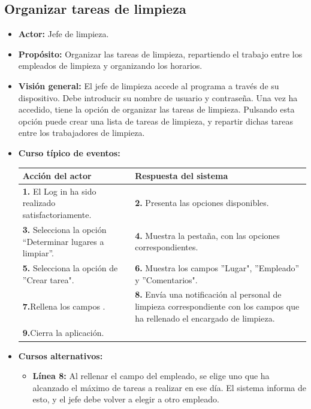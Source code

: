 \documentclass[spanish,a4paper,12pt]{report}	%
\begin{document}
	\subsection{Organizar tareas de limpieza}
			\begin{itemize}
			\item \textbf{Actor: }Jefe de limpieza.
			\item \textbf{Propósito: }Organizar las tareas de limpieza, repartiendo el trabajo entre los empleados de limpieza y organizando los horarios. 		
			\item \textbf{Visión general: }El jefe de limpieza accede al programa a través de su dispositivo. Debe introducir su nombre de usuario y contraseña. Una vez ha accedido, tiene la opción de organizar las tareas de limpieza. Pulsando esta opción puede crear una lista de tareas de limpieza, y repartir dichas tareas entre los trabajadores de limpieza. 
			\item \textbf{Curso típico de eventos:} \\	%
\begin{tabular}{|p{6cm}||p{6cm}|}
				\hline
				\textbf{Acción del actor} & \textbf{Respuesta del sistema} \\ \hline \hline
				\textbf{1.} El Log in ha sido realizado satisfactoriamente. & \textbf{2.} Presenta las opciones disponibles.\\ \hline
				\textbf{3.} Selecciona la opción “Determinar lugares a limpiar”. & \textbf{4.} Muestra la pestaña, con las opciones correspondientes. \\ \hline
				\textbf{5.} Selecciona la opción de ''Crear tarea".	& \textbf{6.} Muestra los campos ''Lugar", ''Empleado'' y ''Comentarios". \\ \hline
				\textbf{7.}Rellena los campos . & \textbf{8.} Envía una notificación al personal de limpieza correspondiente con los campos que ha rellenado el encargado de limpieza.\\ \hline
				\textbf{9.}Cierra la aplicación. & \textbf{} \\ \hline
			\end{tabular}

			\item \textbf{Cursos alternativos:} 
				\begin {itemize}
					
					\item \textbf{Línea 8: } Al rellenar el campo del empleado, se elige uno que ha alcanzado el máximo de tareas a realizar en ese día. El sistema informa de esto, y el jefe debe volver a elegir a otro empleado.
				\end {itemize}
			\end{itemize}%
\end{document}
